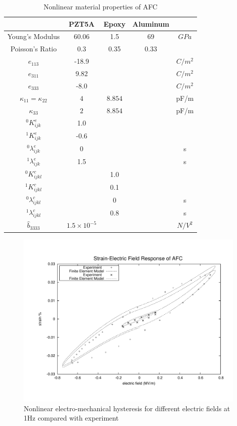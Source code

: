 \begin{table}
\caption{Nonlinear material properties of AFC}
\centering
\begin{tabular}{ccccc} \hline
               & PZT5A & Epoxy & Aluminum & \\ \hline 
Young's Modulus&60.06 & 1.5     & 69       &$GPa$    \\ 
Poisson's Ratio&$0.3$ & 0.35    & 0.33 &\\  
$e_{113}$      &-18.9 &         &      &$C/m^2$\\ 
$e_{311}$      &9.82&         &      &$C/m^2$\\ 
$e_{333}$      &-8.0  &         &      &$C/m^2$\\ 
$\kappa_{11}=\kappa_{22}$ &  $ 4  $ & $8.854  $ & &  pF/m \\ 
$\kappa_{33}$ & $2  $              & $8.854  $ & &  pF/m \\ 
${}^{0}K_{ijk}^{e}$&1.0& & &  \\ 
${}^{1}K_{ijk}^{e}$&-0.6& & & \\ 
${}^{0}\lambda_{ijk}^{e}$&0& & & s \\ 
${}^{1}\lambda_{ijk}^{e}$&1.5& & & s \\  
${}^{0}K_{ijkl}^{c}$& &1.0 & &  \\ 
${}^{1}K_{ijkl}^{c}$& &0.1 & & \\ 
${}^{0}\lambda_{ijkl}^{c}$& &0&  & s\\ 
${}^{1}\lambda_{ijkl}^{c}$& &0.8 & & s \\  
$\widehat{b}_{3333}$ & $1.5 \times 10^{-5}$ & &&  $ N/V^2 $\\ \hline
\end{tabular}
\label{table:non_linear_materila_properties_afc} 
\end{table} 
 
\begin{figure} 
\centering
\includegraphics[trim = 0mm 0mm 0mm 0mm,width=5.0in]
{./chap_4_structural_analyses/afc_unit_cell/non_linear_hysteris_afc/non_linear_electric_field_vs_polarization.pdf}
\caption{Nonlinear electro-mechanical hysteresis for different electric fields at 1Hz compared with experiment}
\label{fig:non_linear_electric_field_vs_polarization}
\end{figure}

